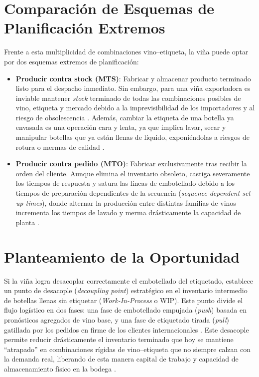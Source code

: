 \section{Comparación de Esquemas de Planificación Extremos\label{sec:sub3}}
Frente a esta multiplicidad de combinaciones vino--etiqueta, la viña puede optar por dos esquemas extremos de planificación:

\begin{itemize}
    \item \textbf{Producir contra stock (MTS)}: Fabricar y almacenar producto terminado listo para el despacho inmediato. Sin embargo, para una viña exportadora es inviable mantener \textit{stock} terminado de todas las combinaciones posibles de vino, etiqueta y mercado debido a la imprevisibilidad de los importadores y al riesgo de obsolescencia \cite{cholette2009}. Además, cambiar la etiqueta de una botella ya envasada es una operación cara y lenta, ya que implica lavar, secar y manipular botellas que ya están llenas de líquido, exponiéndolas a riesgos de rotura o mermas de calidad \cite{cholette2018}.

    \item \textbf{Producir contra pedido (MTO)}: Fabricar exclusivamente tras recibir la orden del cliente. Aunque elimina el inventario obsoleto, castiga severamente los tiempos de respuesta y satura las líneas de embotellado debido a los tiempos de preparación dependientes de la secuencia (\textit{sequence-dependent set-up times}), donde alternar la producción entre distintas familias de vinos incrementa los tiempos de lavado y merma drásticamente la capacidad de planta \cite{maccawley2022}.
\end{itemize}

\section{Planteamiento de la Oportunidad\label{sec:sub4}}
Si la viña logra desacoplar correctamente el embotellado del etiquetado, establece un punto de desacople (\textit{decoupling point}) estratégico en el inventario intermedio de botellas llenas sin etiquetar (\textit{Work-In-Process} o WIP). Este punto divide el flujo logístico en dos fases: una fase de embotellado empujada (\textit{push}) basada en pronósticos agregados de vino base, y una fase de etiquetado tirada (\textit{pull}) gatillada por los pedidos en firme de los clientes internacionales \cite{cholette2009, varas2018}. Este desacople permite reducir drásticamente el inventario terminado que hoy se mantiene ``atrapado'' en combinaciones rígidas de vino--etiqueta que no siempre calzan con la demanda real, liberando de esta manera capital de trabajo y capacidad de almacenamiento físico en la bodega \cite{cholette2009, varas2018}.

